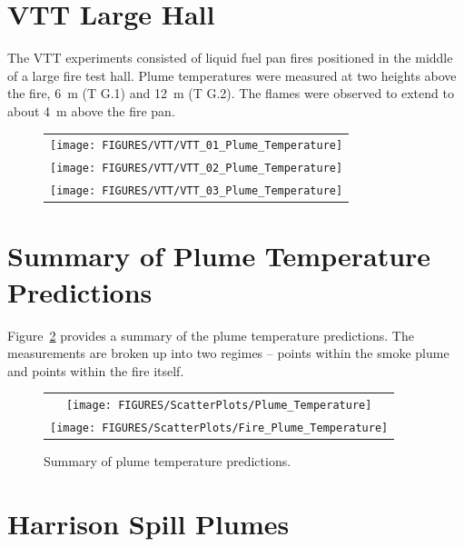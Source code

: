 \clearpage

\section{VTT Large Hall}

\label{VTT_plume}

The VTT experiments consisted of liquid fuel pan fires positioned in the middle of a large fire test hall. Plume temperatures were measured at two heights above the fire, 6~m (T G.1) and 12~m (T G.2). The flames were observed to extend to about 4~m above the fire pan.


\begin{figure}[h]
\begin{center}
\begin{tabular}{c}
\texttt{[image: FIGURES/VTT/VTT\_01\_Plume\_Temperature]} \\
\texttt{[image: FIGURES/VTT/VTT\_02\_Plume\_Temperature]} \\
\texttt{[image: FIGURES/VTT/VTT\_03\_Plume\_Temperature]}
\end{tabular}
\end{center}
\label{VTT_Plume}
\end{figure}


\clearpage


\section{Summary of Plume Temperature Predictions}

Figure~\ref{Plume_Summary} provides a summary of the plume temperature predictions. The measurements are broken up into two regimes -- points within the smoke plume and points within the fire itself.

\begin{figure}[h!]
\begin{center}
\begin{tabular}{c}
\texttt{[image: FIGURES/ScatterPlots/Plume\_Temperature]} \\
\texttt{[image: FIGURES/ScatterPlots/Fire\_Plume\_Temperature]}
\end{tabular}
\end{center}
\caption[Summary of plume temperature predictions]
{Summary of plume temperature predictions.}
\label{Plume_Summary}
\end{figure}



\clearpage

\section{Harrison Spill Plumes}
\label{Harrison_Spill_Plumes}

